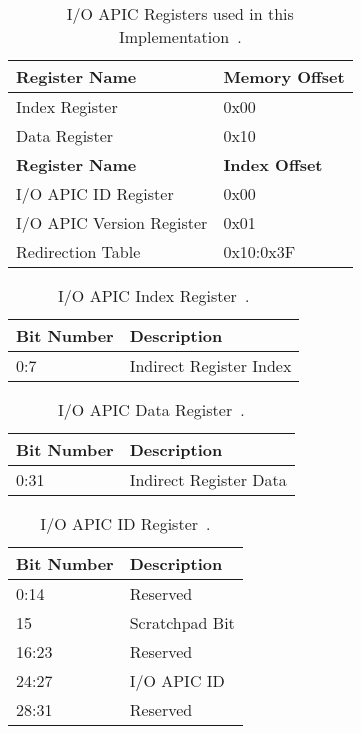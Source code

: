 \begin{table}[H]
  \centering
  \begin{tabularx}{1.0\textwidth}{| X | X |}
    \hline
    \textbf{Register Name}    & \textbf{Memory Offset} \\ \hline\hline
    Index Register            & 0x00                   \\ \hline
    Data Register             & 0x10                   \\ \hline\hline
    \textbf{Register Name}    & \textbf{Index Offset}  \\ \hline\hline
    I/O APIC ID Register      & 0x00                   \\ \hline
    I/O APIC Version Register & 0x01                   \\ \hline
    Redirection Table         & 0x10:0x3F              \\ \hline
  \end{tabularx}
  \caption{I/O APIC Registers used in this Implementation~\autocite[sec.~9.5]{ich5}.}
  \label{tab:ioapicregs}
\end{table}

\begin{table}[H]
  \centering
  \begin{tabularx}{1.0\textwidth}{| X | X |}
    \hline
    \textbf{Bit Number} & \textbf{Description}    \\ \hline\hline
    0:7                 & Indirect Register Index \\ \hline
  \end{tabularx}
  \caption{I/O APIC Index Register~\autocite[sec.~9.5.2]{ich5}.}
  \label{tab:ioapicregsidx}
\end{table}

\begin{table}[H]
  \centering
  \begin{tabularx}{1.0\textwidth}{| X | X |}
    \hline
    \textbf{Bit Number} & \textbf{Description}   \\ \hline\hline
    0:31                & Indirect Register Data \\ \hline
  \end{tabularx}
  \caption{I/O APIC Data Register~\autocite[sec.~9.5.3]{ich5}.}
  \label{tab:ioapicregsdat}
\end{table}

\begin{table}[H]
  \centering
  \begin{tabularx}{1.0\textwidth}{| X | X |}
    \hline
    \textbf{Bit Number} & \textbf{Description} \\ \hline\hline
    0:14                & Reserved             \\ \hline
    15                  & Scratchpad Bit       \\ \hline
    16:23               & Reserved             \\ \hline
    24:27               & I/O APIC ID          \\ \hline
    28:31               & Reserved             \\ \hline
  \end{tabularx}
  \caption{I/O APIC ID Register~\autocite[sec.~9.5.6]{ich5}.}
  \label{tab:ioapicregsid}
\end{table}

